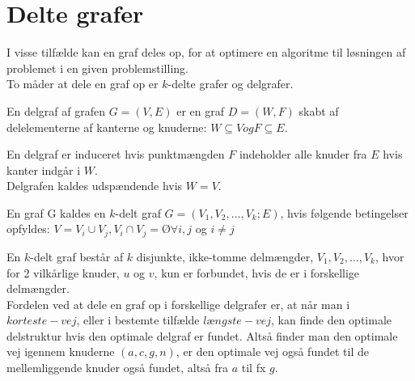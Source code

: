 \section{Delte grafer}
I visse tilfælde kan en graf deles op, for at optimere en algoritme til løsningen af problemet i en given problemstilling. \\
To måder at dele en graf op er $k$-delte grafer og delgrafer.

\begin{defn}	 \label{defn:delgraf} %
En delgraf af grafen $G= (V,E)$ er en graf $D = (W,F)$ skabt af delelementerne af kanterne og knuderne: $W \subseteq V og F \subseteq E$.
\end{defn}

En delgraf er induceret hvis punktmængden $F$ indeholder alle knuder fra $E$ hvis kanter indgår i $W$. \\

Delgrafen kaldes udspændende hvis $W=V$. 


\begin{defn} \label{defn:k-delt} %
En graf G kaldes en $k$-delt graf $G = (V_1, V_2, \ldots, V_k; E)$, hvis følgende betingelser opfyldes: $V= V_i \cup V_j, V_i \cap V_j = Ø \forall i,j$ og $i\neq j$ 
\end{defn}

En $k$-delt graf består af $k$ disjunkte, ikke-tomme delmængder, $V_1, V_2, \ldots, V_k$, hvor for 2 vilkårlige knuder, $u$ og $v$, kun er forbundet, hvis de er i forskellige delmængder. \\


Fordelen ved at dele en graf op i forskellige delgrafer er, at når man i $korteste-vej$, eller i bestemte tilfælde $længste-vej$, kan finde den optimale delstruktur hvis den optimale delgraf er fundet. Altså finder man den optimale vej igennem knuderne $(a, c, g, n)$, er den optimale vej også fundet til de mellemliggende knuder også fundet, altså fra $a$ til fx $g$.

